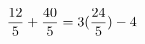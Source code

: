\documentclass[preview]{standalone}
\begin{document}
\begin{align*}
\special{dvisvgm:raw <g id='unique000'>}\frac{12}{5} + \frac{40}{5} = 3(\frac{24}{5}) - 4\special{dvisvgm:raw </g>}
\end{align*}
\end{document}
